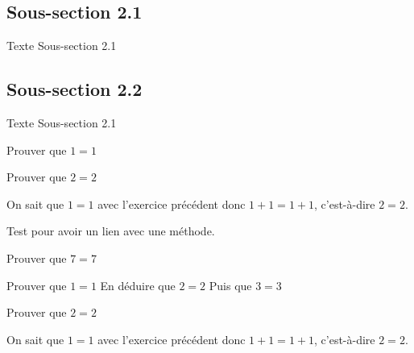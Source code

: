 \documentclass[nocrop]{sesamanuel}
\begin{document}
\subsection{Sous-section 2.1}
Texte Sous-section 2.1
\subsection{Sous-section 2.2}
Texte Sous-section 2.1

\exercicesbase
\begin{colonne*exercice}
  \begin{exercice}
  Prouver que $1=1$
  \end{exercice}
  \begin{exercice*}
  Prouver que $2=2$
  \end{exercice*}
  \begin{corrige}
  On sait que $1=1$ avec l’exercice précédent donc $1+1=1+1$,
  c’est-à-dire $2=2$.
  \end{corrige}
  \begin{exercice}
  \label{exo-exemple1}
  Test pour avoir un lien avec une méthode.
  \end{exercice}
  \begin{exercice}
    Prouver que $7=7$
  \end{exercice}

  \begin{exercice}
    \partie
    Prouver que $1=1$
    \partie
    En déduire que $2=2$
    \partie 
    Puis que $3=3$
  \end{exercice}
  \begin{exercice*}
  Prouver que $2=2$
  \end{exercice*}
  \begin{corrige}
  On sait que $1=1$ avec l’exercice précédent donc $1+1=1+1$,
  c’est-à-dire $2=2$.
  \end{corrige}
\end{colonne*exercice}
\end{document}
